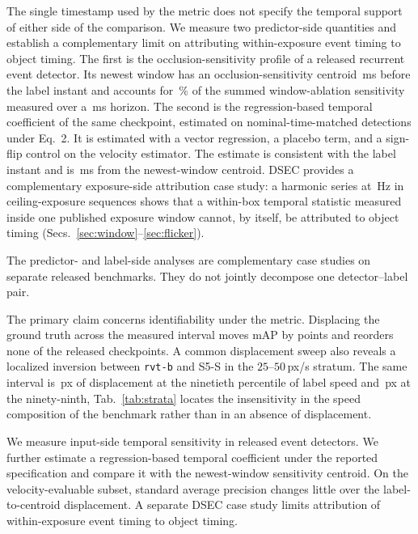 \documentclass[10pt,twocolumn,letterpaper]{article}
\begin{document}
The single timestamp used by the metric does not specify the temporal support of
either side of the comparison. We measure two predictor-side quantities and
establish a complementary limit on attributing within-exposure event timing to
object timing. The first is the
occlusion-sensitivity profile of a released recurrent event detector. Its newest
window has an occlusion-sensitivity centroid \rvtCentroidMagMeas\,ms before the
label instant and accounts for \histShareTwenty\,\% of the summed window-ablation
sensitivity measured over a \histHorizonB\,ms horizon. The second is the
regression-based temporal coefficient of the same checkpoint, estimated on
nominal-time-matched detections under Eq.~2. It is estimated
with a vector regression, a placebo term, and a sign-flip control on the velocity
estimator. The estimate is consistent with the label instant and is
\outInterval\,ms from the newest-window centroid. DSEC provides a complementary
exposure-side attribution case study: a harmonic series at \flickerLineHz\,Hz in
\dsecCeilingSeqs{} ceiling-exposure sequences shows that a within-box temporal
statistic measured inside one published exposure window cannot, by itself, be
attributed to object timing (Secs.~\ref{sec:window}--\ref{sec:flicker}).

The predictor- and label-side analyses are complementary case studies on separate
released benchmarks. They do not jointly decompose one detector--label pair.

The primary claim concerns identifiability under the metric. Displacing the
ground truth across the measured interval moves mAP by \mapCost{} points and
reorders none of the \rankCkpts{} released checkpoints. A common displacement
sweep also reveals a localized inversion between \texttt{rvt-b} and S5-S in the
$25$--$50$\,px/s stratum. The same interval is \outPxNinety\,px of displacement at the
ninetieth percentile of label speed and \outPxNinetynine\,px at the
ninety-ninth, Tab.~\ref{tab:strata} locates the insensitivity in the speed
composition of the benchmark rather than in an absence of displacement.

We measure input-side temporal sensitivity in released event detectors. We further
estimate a regression-based temporal coefficient under the reported
specification and compare it with the newest-window sensitivity centroid. On the
velocity-evaluable subset, standard average precision changes little over the
label-to-centroid displacement. A separate DSEC case study limits attribution of
within-exposure event timing to object timing.
\end{document}
